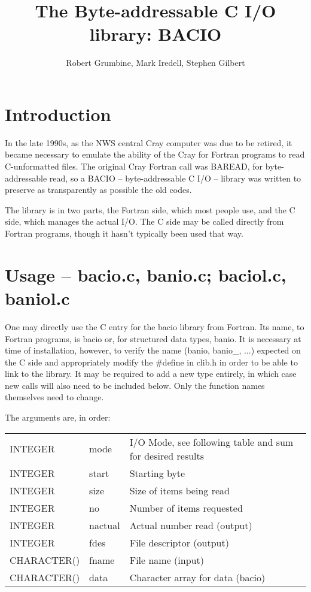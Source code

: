 \documentclass[11pt]{article}
\title{The Byte-addressable C I/O library: BACIO}
\author{Robert Grumbine, Mark Iredell, Stephen Gilbert}
\begin{document}
\maketitle

\section{Introduction}
  In the late 1990s, as the NWS central Cray computer was due to be retired, it 
became necessary to emulate the ability of the Cray for Fortran programs to 
read C-unformatted files.  The original Cray Fortran call was BAREAD, for
byte-addressable read, so a BACIO -- byte-addressable C I/O -- library was written
to preserve as transparently as possible the old codes.

  The library is in two parts, the Fortran side, which most people use, and
the C side, which manages the actual I/O.  The C side may be called directly from
Fortran programs, though it hasn't typically been used that way.


\section{Usage -- bacio.c, banio.c; baciol.c, baniol.c}

  One may directly use the C entry for the bacio library from Fortran.  
Its name, to Fortran programs, is bacio or, for structured data types, 
banio.  It is necessary at time of installation, however, to verify 
the name (banio, banio\_, ...) expected on the C side and appropriately
modify the \#define in clib.h in order to be able to link to the library.
It may be required to add a new type entirely, in which case new
calls will also need to be included below.  Only the function names themselves
need to change.  

  The arguments are, in order:\\
\begin{tabular}{lll}
INTEGER &mode & I/O Mode, see following table and sum for desired results \\
INTEGER &start&  Starting byte \\
INTEGER &size&  Size of items being read\\
INTEGER &no & Number of items requested \\
INTEGER &nactual&  Actual number read (output) \\
INTEGER &fdes & File descriptor (output) \\
CHARACTER() &fname & File name (input) \\
CHARACTER() &data & Character array for data (bacio) \\
\end{tabular}
\end{document}
